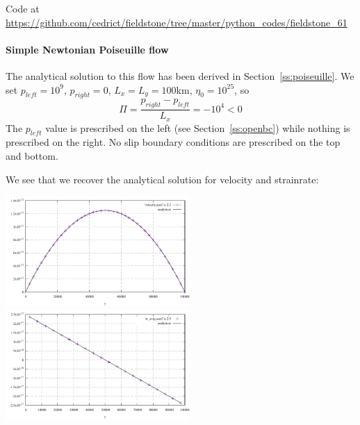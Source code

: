 Code at \url{https://github.com/cedrict/fieldstone/tree/master/python_codes/fieldstone_61}

\paragraph{Simple Newtonian Poiseuille flow} The analytical solution to this flow has been derived 
in Section~\ref{ss:poiseuille}.
We set $p_{left}=10^9$, $p_{right}=0$, $L_x=L_y=100$km, $\eta_0=10^{25}$, so 
\[
\Pi=\frac{p_{right}-p_{left}}{L_x}=-10^4 <0
\]
The $p_{left}$ value is prescribed on the left (see Section~\ref{ss:openbc}) while 
nothing is prescribed on the right. No slip boundary conditions are 
prescribed on the top and bottom.

We see that we recover the analytical solution for velocity and strainrate:
\begin{center}
\includegraphics[width=7cm]{python_codes/fieldstone_61/results/poiseuille/velocity}
\includegraphics[width=7cm]{python_codes/fieldstone_61/results/poiseuille/exy}
\end{center}

